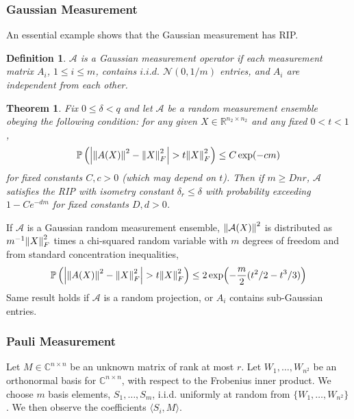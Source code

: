 \documentclass[10pt]{article}  %
\theoremstyle{plain}
\newtheorem{theorem}{Theorem}[section]
\newtheorem{definition}[thm]{Definition}
\numberwithin{equation}{section}
\newcommand{\innerp}[1]{\langle{#1}\rangle}
\def\mN{\mathcal{N}}
\def\mA{\mathcal{A}}
\def\R{\mathbb{R}}
\def\C{\mathbb{C}}
\renewcommand{\R}{\mathbb{R}}
\renewcommand{\C}{\mathbb{C}}
\begin{document}
\subsubsection{Gaussian Measurement}
An essential example shows that the Gaussian measurement has RIP.
\begin{definition}
	$\mA$ is a Gaussian measurement operator if each measurement matrix $A_i$, $1 \leq i \leq m$, contains $i.i.d.$ $\mN(0, 1/m)$ entries, and $A_i$ are independent from each other. 
\end{definition}

\begin{theorem}\cite[Theorem 2.3]{candesTightOracleBounds}
	Fix $0 \leq \delta < q$ and let $\mA$ be a random measurement ensemble obeying the following condition: for any given $X \in \R^{n_2 \times n_2}$ and any fixed $0 < t < 1$, 
	\begin{equation}
		\mathbb{P}\left(\abs{\norm{A(X)}^2 - \norm{X}^2_F} > t \norm{X}^2_F\right) \leq C\exp(-cm)
	\end{equation}
	for fixed constants $C, c > 0$ (which may depend on $t$). Then if $m \geq Dnr$, $\mA$ satisfies the RIP with isometry constant $\delta_r \leq \delta$ with probability exceeding $1 - Ce^{-dm}$ for fixed constants $D, d >0$. 
\end{theorem}

If $\mA$ is a Gaussian random measurement ensemble, $\norm{\mA(X)}^2$ is distributed as $m^{-1}\norm{X}^2_F$ times a chi-squared random variable with $m$ degrees of freedom and from standard concentration inequalities, \\
\begin{equation}
	\mathbb{P}\left(\abs{\norm{A(X)}^2 - \norm{X}^2_F} > t \norm{X}^2_F\right) \leq 2\exp(-\frac{m}{2}(t^2/2 - t^3/3))
\end{equation}
Same result holds if $\mA$ is a random projection, or $A_i$ contains sub-Gaussian entries.

\subsubsection{Pauli Measurement}
Let $M\in \C^{n \times n}$ be an unknown matrix of rank at most $r$. Let $W_1, \dots, W_{n^2}$ be an orthonormal basis for $\C^{n \times n}$, with respect to the Frobenius inner product. We choose $m$ basis elements, $S_1, \dots, S_m$, i.i.d. uniformly at random from $\{W_1, \dots, W_{n^2}\}$. We then observe the coefficients $\innerp{S_i, M}$. 
\end{document}
